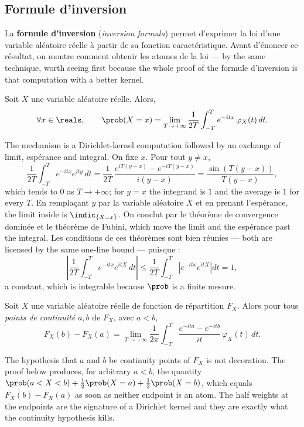 \subsection{Formule d'inversion}

La \textbf{formule d'inversion} (\textit{inversion formula}) permet d'exprimer la loi d'une variable aléatoire réelle à partir de sa
fonction caractéristique. Avant d'énoncer ce résultat, on montre comment obtenir les atomes de
la loi --- by the same technique, worth seeing first because the whole proof of the formule
d'inversion is that computation with a better kernel.

\begin{prop}
Soit $X$ une variable aléatoire réelle. Alors,
\[
  \forall x \in \reals, \qquad \prob(X = x) = \lim_{T \to +\infty} \frac{1}{2T}\int_{-T}^{T}
  e^{-itx}\,\varphi_{X}(t)\,dt.
\]
\end{prop}

\begin{remark}
The mechanism is a Dirichlet-kernel computation followed by an exchange of limit,
espérance and integral. On fixe $x$. Pour tout $y \neq x$,
\[
  \frac{1}{2T}\int_{-T}^{T} e^{-itx}e^{ity}\,dt = \frac{1}{2T}\,\frac{e^{iT(y-x)} -
  e^{-iT(y-x)}}{i(y-x)} = \frac{\sin\!\left(T(y-x)\right)}{T(y-x)},
\]
which tends to $0$ as $T \to +\infty$; for $y = x$ the integrand is $1$ and the average is
$1$ for every $T$. En remplaçant $y$ par la variable aléatoire $X$ et en prenant l'espérance,
the limit inside is $\indic_{\{X = x\}}$. On conclut par le théorème de convergence dominée
et le théorème de Fubini, which move the limit and the espérance past the integral. Les
conditions de ces théorèmes sont bien réunies --- both are licensed by the same one-line
bound --- puisque :
\[
  \left|\frac{1}{2T}\int_{-T}^{T} e^{-itx}e^{itX}\,dt\right| \leq
  \frac{1}{2T}\int_{-T}^{T}\left|e^{-itx}e^{itX}\right|dt = 1,
\]
a constant, which is integrable because $\prob$ is a finite mesure.
\end{remark}

\begin{theorem}
Soit $X$ une variable aléatoire réelle de fonction de répartition $F_{X}$. Alors pour tous
\emph{points de continuité} $a, b$ de $F_{X}$, avec $a < b$,
\[
  F_{X}(b) - F_{X}(a) = \lim_{T \to +\infty} \frac{1}{2\pi}\int_{-T}^{T} \frac{e^{-ita} -
  e^{-itb}}{it}\,\varphi_{X}(t)\,dt.
\]
\end{theorem}

The hypothesis that $a$ and $b$ be continuity points of $F_{X}$ is not decoration. The proof
below produces, for arbitrary $a < b$, the quantity $\prob(a < X < b) + \tfrac{1}{2}\prob(X
= a) + \tfrac{1}{2}\prob(X = b)$, which equals $F_{X}(b) - F_{X}(a)$ as soon as neither
endpoint is an atom. The half weights at the endpoints are the signature of a Dirichlet
kernel and they are exactly what the continuity hypothesis kills.

